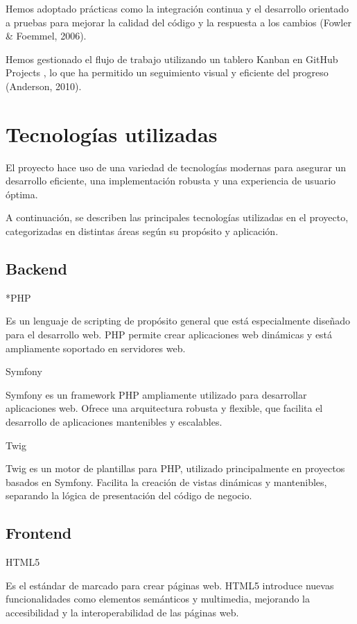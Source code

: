 Hemos adoptado prácticas como la integración continua y el desarrollo orientado a pruebas para mejorar la
calidad del código y la respuesta a los cambios (Fowler & Foemmel, 2006).

Hemos gestionado el flujo de trabajo utilizando un tablero Kanban en GitHub Projects
, lo que ha permitido un seguimiento visual y eficiente del progreso (Anderson, 2010).


\section{Tecnologías utilizadas}
El proyecto hace uso de una variedad de tecnologías modernas para asegurar un desarrollo eficiente,
una implementación robusta y una experiencia de usuario óptima.

A continuación, se describen las principales tecnologías utilizadas en
el proyecto, categorizadas en distintas áreas según su propósito y aplicación.

\subsection{Backend}

*PHP

Es un lenguaje de scripting de propósito general que está especialmente diseñado para el desarrollo web. PHP
permite crear aplicaciones web dinámicas y está ampliamente soportado en servidores web.

Symfony

Symfony es un framework PHP ampliamente utilizado para desarrollar aplicaciones web. Ofrece una arquitectura robusta
y flexible, que facilita el desarrollo de aplicaciones mantenibles y escalables.

Twig

Twig es un motor de plantillas para PHP, utilizado principalmente en proyectos basados en
Symfony. Facilita la creación de vistas dinámicas y mantenibles,
separando la lógica de presentación del código de negocio.

\subsection{Frontend}

HTML5

Es el estándar de marcado para crear páginas web. HTML5 introduce nuevas funcionalidades como
elementos semánticos y multimedia, mejorando la accesibilidad y la interoperabilidad de las páginas web.

